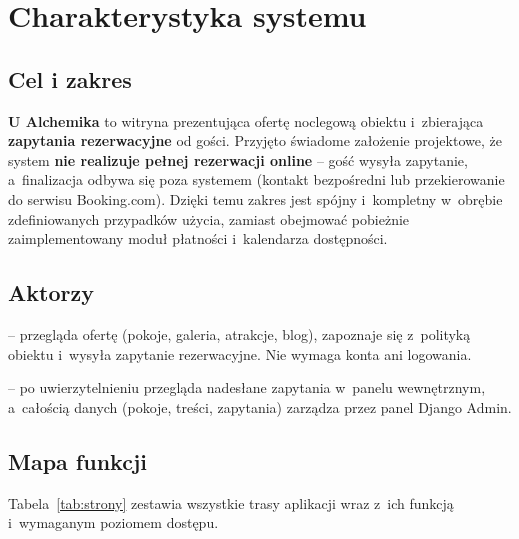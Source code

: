 \documentclass[12pt,a4paper]{article}
\begin{document}
\section{Charakterystyka systemu}
\label{sec:charakterystyka}

\subsection{Cel i zakres}

\textbf{U Alchemika} to witryna prezentująca ofertę noclegową obiektu i~zbierająca
\textbf{zapytania rezerwacyjne} od gości. Przyjęto świadome założenie projektowe, że
system \textbf{nie realizuje pełnej rezerwacji online} -- gość wysyła zapytanie,
a~finalizacja odbywa się poza systemem (kontakt bezpośredni lub przekierowanie do
serwisu Booking.com). Dzięki temu zakres jest spójny i~kompletny w~obrębie
zdefiniowanych przypadków użycia, zamiast obejmować pobieżnie zaimplementowany moduł
płatności i~kalendarza dostępności.

\subsection{Aktorzy}

\begin{description}[nosep]
  \item[Gość (użytkownik anonimowy)] -- przegląda ofertę (pokoje, galeria,
    atrakcje, blog), zapoznaje się z~polityką obiektu i~wysyła zapytanie
    rezerwacyjne. Nie wymaga konta ani logowania.
  \item[Obsługa / administrator] -- po uwierzytelnieniu przegląda nadesłane
    zapytania w~panelu wewnętrznym, a~całością danych (pokoje, treści, zapytania)
    zarządza przez panel Django Admin.
\end{description}

\subsection{Mapa funkcji}

Tabela~\ref{tab:strony} zestawia wszystkie trasy aplikacji wraz z~ich funkcją
i~wymaganym poziomem dostępu.
\end{document}
